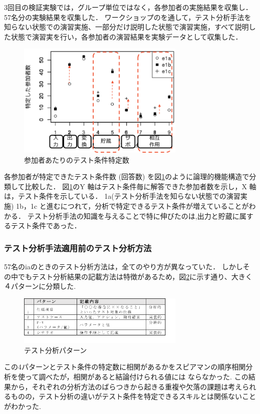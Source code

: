 \documentclass[10pt,a4j]{jarticle}
\begin{document}
3回目の検証実験では，グループ単位ではなく，各参加者の実施結果を収集し．57名分の実験結果を収集した．
ワークショップのを通して，テスト分析手法を知らない状態での演習実施、一部分だけ説明した状態で演習実施，すべて説明した状態で演習実を行い，各参加者の演習結果を実験データとして収集した．

\begin{figure}[h]
  \begin{center}
  \includegraphics[width=8cm]{./image/D-3-Fig12-1.png}
  \caption{参加者あたりのテスト条件特定数}
  \label{fig:D-3-Fig12-1}
  \end{center}
\end{figure}

各参加者が特定できたテスト条件数 (回答数) を図\ref{fig:D-3-Fig12-1}のように論理的機能構造で分類して比較した．
図\ref{fig:D-3-Fig12-1}のY 軸はテスト条件毎に解答できた参加者数を示し，X 軸は，テスト条件を示している． 
1a(テスト分析手法を知らない状態での演習実施) 1b，1c と進むにつれて，分析で特定できるテスト条件が増えていることがわかる．
テスト分析手法の知識を与えることで特に伸びたのは,出力と貯蔵に属するテスト条件であった．

\subsubsection{テスト分析手法適用前のテスト分析方法}
57名のiaのときのテスト分析方法は，全てのやり方が異なっていた．
しかしその中でもテスト分析結果の記載方法は特徴があるため，図\ref{fig:D-3-Fig14}に示す通り、大きく４パターンに分類した.
\begin{figure}[h]
  \begin{center}
  \includegraphics[width=8cm]{./image/D-3-Fig14.png}
  \caption{テスト分析パターン}
  \label{fig:D-3-Fig14}
  \end{center}
\end{figure}
この4パターンとテスト条件の特定数に相関があるかをスピアマンの順序相関分析を使って調べたが，相関があると結論付けられる値には
ならなかった.
この結果から，それぞれの分析方法のばらつきから起きる重複や欠落の課題は考えられるものの，テスト分析の違いがテスト条件を特定できるスキルとは関係ないことがわかった.
\end{document}
